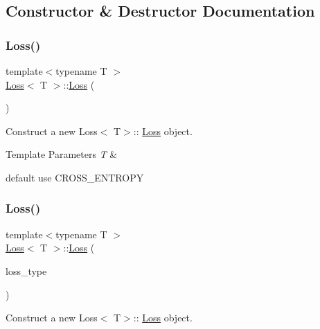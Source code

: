 \subsection{Constructor \& Destructor Documentation}
\mbox{\label{class_loss_a76394ddc3da09eb5d4929e1ea03a667c}} 
\subsubsection{\texorpdfstring{Loss()}{Loss()}\hspace{0.1cm}{\footnotesize\ttfamily [1/2]}}
{\footnotesize\ttfamily template$<$typename T $>$ \\
\mbox{\hyperlink{class_loss}{Loss}}$<$ T $>$\+::\mbox{\hyperlink{class_loss}{Loss}} (\begin{DoxyParamCaption}{ }\end{DoxyParamCaption})}



Construct a new Loss$<$ T$>$\+:: \mbox{\hyperlink{class_loss}{Loss}} object. 


\begin{DoxyTemplParams}{Template Parameters}
{\em T} & \\
\hline
\end{DoxyTemplParams}
default use C\+R\+O\+S\+S\+\_\+\+E\+N\+T\+R\+O\+PY\mbox{\label{class_loss_a5b75c55ce90781d1b12d02f1bedbfa4f}} 
\subsubsection{\texorpdfstring{Loss()}{Loss()}\hspace{0.1cm}{\footnotesize\ttfamily [2/2]}}
{\footnotesize\ttfamily template$<$typename T $>$ \\
\mbox{\hyperlink{class_loss}{Loss}}$<$ T $>$\+::\mbox{\hyperlink{class_loss}{Loss}} (\begin{DoxyParamCaption}\item[{\mbox{\hyperlink{loss_8hpp_a72b6675b9bd68360ebc6e54006d8220f}{L\+O\+S\+S\+\_\+\+T\+Y\+PE}}}]{loss\+\_\+type }\end{DoxyParamCaption})}



Construct a new Loss$<$ T$>$\+:: \mbox{\hyperlink{class_loss}{Loss}} object. 


